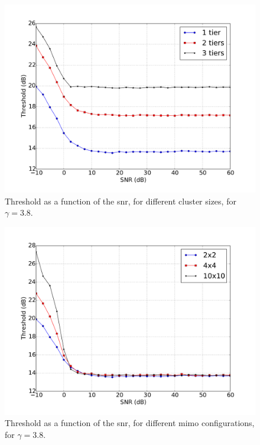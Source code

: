 \begin{figure}[t]
	\centering
	\includegraphics[width=0.75\columnwidth]{./21.appendices/img/threshold_snr_tiers_02x02_c02_r1300}
    \caption{Threshold as a function of the \gls{snr}, for different cluster
    sizes, for $\gamma = 3.8$.}
	\label{fig:th_snr_tiers}
\end{figure}

\begin{figure}[t]
	\centering
	\includegraphics[width=0.75\columnwidth]{./21.appendices/img/threshold_snr_anten_02x02_t02_i01_r1300}
    \caption{Threshold as a function of the \gls{snr}, for different \gls{mimo}
    configurations, for $\gamma = 3.8$.}
	\label{fig:th_snr_ant}
\end{figure}

